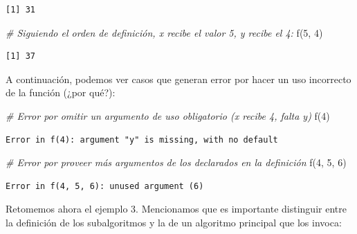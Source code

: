 \documentclass[
]{book}
\newenvironment{Shaded}{\begin{snugshade}}{\end{snugshade}}
\newcommand{\CommentTok}[1]{\textcolor[rgb]{0.56,0.35,0.01}{\textit{#1}}}
\newcommand{\DecValTok}[1]{\textcolor[rgb]{0.00,0.00,0.81}{#1}}
\newcommand{\FunctionTok}[1]{\textcolor[rgb]{0.00,0.00,0.00}{#1}}
\newcommand{\NormalTok}[1]{#1}
\begin{document}
\begin{verbatim}
[1] 31
\end{verbatim}

\begin{Shaded}
\begin{Highlighting}[]
\CommentTok{\# Siguiendo el orden de definición, x recibe el valor 5, y recibe el 4:}
\FunctionTok{f}\NormalTok{(}\DecValTok{5}\NormalTok{, }\DecValTok{4}\NormalTok{)}
\end{Highlighting}
\end{Shaded}

\begin{verbatim}
[1] 37
\end{verbatim}

A continuación, podemos ver casos que generan error por hacer un uso incorrecto de la función (¿por qué?):

\begin{Shaded}
\begin{Highlighting}[]
\CommentTok{\# Error por omitir un argumento de uso obligatorio (x recibe 4, falta y)}
\FunctionTok{f}\NormalTok{(}\DecValTok{4}\NormalTok{)}
\end{Highlighting}
\end{Shaded}

\begin{verbatim}
Error in f(4): argument "y" is missing, with no default
\end{verbatim}

\begin{Shaded}
\begin{Highlighting}[]
\CommentTok{\# Error por proveer más argumentos de los declarados en la definición}
\FunctionTok{f}\NormalTok{(}\DecValTok{4}\NormalTok{, }\DecValTok{5}\NormalTok{, }\DecValTok{6}\NormalTok{)}
\end{Highlighting}
\end{Shaded}

\begin{verbatim}
Error in f(4, 5, 6): unused argument (6)
\end{verbatim}

Retomemos ahora el ejemplo 3. Mencionamos que es importante distinguir entre la definición de los subalgoritmos y la de un algoritmo principal que los invoca:
\end{document}
